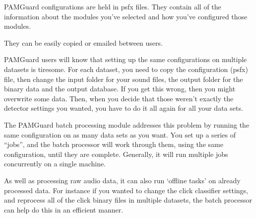 \documentclass[
]{article}
\begin{document}
\begin{tcolorbox}[enhanced jigsaw, titlerule=0mm, bottomrule=.15mm, leftrule=.75mm, coltitle=black, breakable, colframe=quarto-callout-tip-color-frame, left=2mm, toptitle=1mm, rightrule=.15mm, colback=white, bottomtitle=1mm, colbacktitle=quarto-callout-tip-color!10!white, opacityback=0, title=\textcolor{quarto-callout-tip-color}{\faLightbulb}\hspace{0.5em}{PAMGuard configuration files}, arc=.35mm, opacitybacktitle=0.6, toprule=.15mm]

PAMGuard configurations are held in psfx files. They contain all of the
information about the modules you've selected and how you've configured
those modules.

They can be easily copied or emailed between users.

\end{tcolorbox}

PAMGuard users will know that setting up the same configurations on
multiple datasets is tiresome. For each dataset, you need to copy the
configuration (psfx) file, then change the input folder for your sound
files, the output folder for the binary data and the output database. If
you get this wrong, then you might overwrite some data. Then, when you
decide that those weren't exactly the detector settings you wanted, you
have to do it all again for all your data sets.

The PAMGuard batch processing module addresses this problem by running
the same configuration on as many data sets as you want. You set up a
series of ``jobs'', and the batch processor will work through them,
using the same configuration, until they are complete. Generally, it
will run multiple jobs concurrently on a single machine.

As well as processing raw audio data, it can also run `offline tasks' on
already processed data. For instance if you wanted to change the click
classifier settings, and reprocess all of the click binary files in
multiple datasets, the batch processor can help do this in an efficient
manner.
\end{document}
